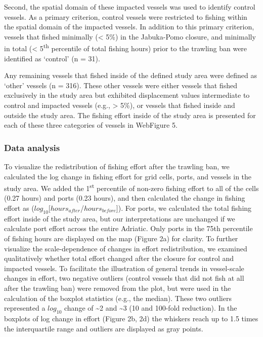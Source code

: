 \documentclass[11pt,]{article}
\begin{document}
Second, the spatial domain of these impacted vessels was used to
identify control vessels. As a primary criterion, control vessels were
restricted to fishing within the spatial domain of the impacted vessels.
In addition to this primary criterion, vessels that fished minimally
(\textless{} 5\%) in the Jabuka-Pomo closure, and minimally in total
(\textless{} 5\textsuperscript{th} percentile of total fishing hours)
prior to the trawling ban were identified as `control' (n = 31).

Any remaining vessels that fished inside of the defined study area were
defined as `other' vessels (n = 316). These other vessels were either
vessels that fished exclusively in the study area but exhibited
displacement values intermediate to control and impacted vessels (e.g.,
\textgreater{} 5\%), or vessels that fished inside and outside the study
area. The fishing effort inside of the study area is presented for each
of these three categories of vessels in WebFigure 5.

\subsubsection{Data analysis}\label{data-analysis}

To visualize the redistribution of fishing effort after the trawling
ban, we calculated the log change in fishing effort for grid cells,
ports, and vessels in the study area. We added the 1\textsuperscript{st}
percentile of non-zero fishing effort to all of the cells (0.27 hours)
and ports (0.23 hours), and then calculated the change in fishing effort
as (\(log_{10}\){[}\(hours_{after}\)/\(hours_{before}\){]}). For ports,
we calculated the total fishing effort inside of the study area, but our
interpretations are unchanged if we calculate port effort across the
entire Adriatic. Only ports in the 75th percentile of fishing hours are
displayed on the map (Figure 2a) for clarity. To further visualize the
scale-dependence of changes in effort redistribution, we examined
qualitatively whether total effort changed after the closure for control
and impacted vessels. To facilitate the illustration of general trends
in vessel-scale changes in effort, two negative outliers (control
vessels that did not fish at all after the trawling ban) were removed
from the plot, but were used in the calculation of the boxplot
statistics (e.g., the median). These two outliers represented a
\(log_{10}\) change of \textasciitilde{}2 and \textasciitilde{}3 (10 and
100-fold reduction). In the boxplots of log change in effort (Figure 2b,
2d) the whiskers reach up to 1.5 times the interquartile range and
outliers are displayed as gray points.
\end{document}
